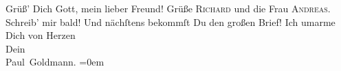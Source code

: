 \begin{ledgroupsized}[t]{13cm}
           Grüß’ Dich Gott, mein lieber Freund! Grüße \textsc{Richard} und die Frau \textsc{Andreas}.\pend
           \pstart
           Schreib’ mir bald!\pend
           \pstart
           Und nächſtens bekommſt Du den großen Brief!\pend
           \pstart
           Ich umarme {\\[\baselineskip]}Dich von Herzen {\\[\baselineskip]}Dein {\\[\baselineskip]}\spacefill\mbox{Paul Goldmann.}\pend
           \leftskip=0em{}
         
         \endnumbering{}\end{ledgroupsized}  \newcommand{\dateiname}{L02735}\newcommand{\titel}{Paul Goldmann an Arthur Schnitzler, 19. 5. [1895]}\newcommand{\editorInnen}{Martin Anton Müller und Laura Untner}
      
